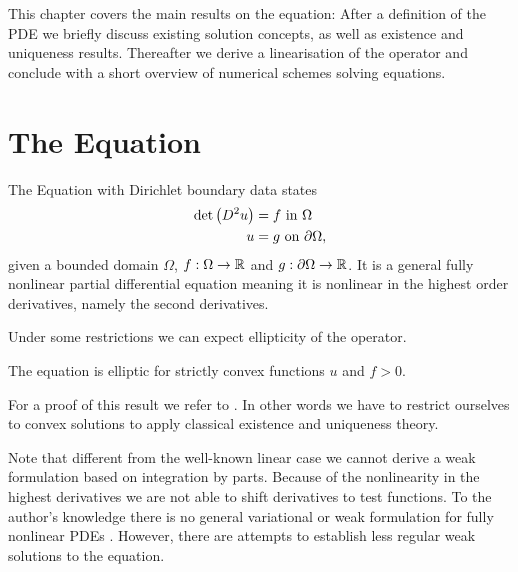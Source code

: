 This chapter covers the main results on the \MA equation: After a definition of the PDE we briefly discuss existing solution concepts, as well as existence and uniqueness results. Thereafter we derive a linearisation of the \MA operator and conclude with a short overview of numerical schemes solving \MA equations. 


\section{The \MA Equation}

The \MA Equation with Dirichlet boundary data states
\begin{align}
	 \det{\left(D^2 u\right)} &= f \textnormal{ in } \Omega \label{eq: MA eq}\\
	 u & = g \textnormal{ on } \partial \Omega, \label{eq: MA equation dirilecht}
\end{align}
given a bounded domain $\Omega$, $f:\Omega \rightarrow \mathbb{R}$ and $g:\partial \Omega \rightarrow \mathbb{R}$.
It is a general fully nonlinear partial differential equation meaning it is nonlinear in the highest order derivatives, namely the second derivatives.

Under some restrictions we can expect ellipticity of the \MA operator.
\begin{proposition}
	The \MA equation is elliptic for strictly convex functions $u$ and $f > 0$.
\end{proposition}
For a proof of this result we refer to \cite{CC1995, GT1983}. In other words we have to restrict ourselves to convex solutions to apply classical existence and uniqueness theory.

Note that different from the well-known linear case we cannot derive a weak formulation based on integration by parts. Because of the nonlinearity in the highest derivatives we are not able to shift derivatives to test functions. To the author's knowledge there is no general variational or weak formulation for fully nonlinear PDEs \cite{FGN2013}.
However, there are attempts to establish less regular weak solutions to the \MA equation.

